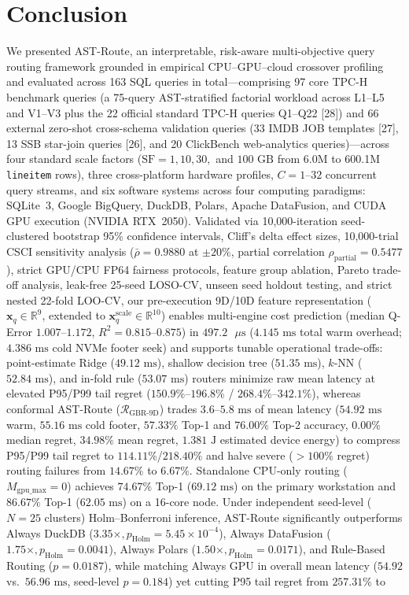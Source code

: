 \documentclass[10pt,a4paper]{article}
\begin{document}
\section{Conclusion}
We presented AST-Route, an interpretable, risk-aware multi-objective query routing framework grounded in empirical CPU--GPU--cloud crossover profiling and evaluated across 163 SQL queries in total---comprising 97 core TPC-H benchmark queries (a 75-query AST-stratified factorial workload across L1--L5 and V1--V3 plus the 22 official standard TPC-H queries Q1--Q22 [28]) and 66 external zero-shot cross-schema validation queries (33 IMDB JOB templates [27], 13 SSB star-join queries [26], and 20 ClickBench web-analytics queries)---across four standard scale factors ($\text{SF}=1, 10, 30,$ and $100\text{ GB}$ from 6.0M to 600.1M \texttt{lineitem} rows), three cross-platform hardware profiles, $C=1\text{--}32$ concurrent query streams, and six software systems across four computing paradigms: SQLite~3, Google BigQuery, DuckDB, Polars, Apache DataFusion, and CUDA GPU execution (NVIDIA RTX~2050). Validated via 10,000-iteration seed-clustered bootstrap 95\% confidence intervals, Cliff's delta effect sizes, 10,000-trial CSCI sensitivity analysis ($\bar{\rho}=0.9880$ at $\pm 20\%$, partial correlation $\rho_{\text{partial}}=0.5477$), strict GPU/CPU FP64 fairness protocols, feature group ablation, Pareto trade-off analysis, leak-free 25-seed LOSO-CV, unseen seed holdout testing, and strict nested 22-fold LOO-CV, our pre-execution 9D/10D feature representation ($\mathbf{x}_q\in\mathbb{R}^9$, extended to $\mathbf{x}_q^{\text{scale}}\in\mathbb{R}^{10}$) enables multi-engine cost prediction (median Q-Error $1.007\text{--}1.172$, $R^2=0.815\text{--}0.875$) in $497.2\text{ }\mu\text{s}$ ($4.145\text{ ms}$ total warm overhead; $4.386\text{ ms}$ cold NVMe footer seek) and supports tunable operational trade-offs: point-estimate Ridge ($49.12\text{ ms}$), shallow decision tree ($51.35\text{ ms}$), $k$-NN ($52.84\text{ ms}$), and in-fold rule ($53.07\text{ ms}$) routers minimize raw mean latency at elevated P95/P99 tail regret ($150.9\%\text{--}196.8\%$ / $268.4\%\text{--}342.1\%$), whereas conformal AST-Route ($\mathcal{R}_{\text{GBR-9D}}$) trades $3.6\text{--}5.8\text{ ms}$ of mean latency ($54.92\text{ ms}$ warm, $55.16\text{ ms}$ cold footer, $57.33\%$ Top-1 and $76.00\%$ Top-2 accuracy, $0.00\%$ median regret, $34.98\%$ mean regret, $1.381\text{ J}$ estimated device energy) to compress P95/P99 tail regret to $114.11\%$/$218.40\%$ and halve severe ($>100\%$ regret) routing failures from $14.67\%$ to $6.67\%$. Standalone CPU-only routing ($M_{\text{gpu\_max}}=0$) achieves $74.67\%$ Top-1 ($69.12\text{ ms}$) on the primary workstation and $86.67\%$ Top-1 ($62.05\text{ ms}$) on a 16-core node. Under independent seed-level ($N=25$ clusters) Holm--Bonferroni inference, AST-Route significantly outperforms Always DuckDB ($3.35\times, p_{\text{Holm}}=5.45\times 10^{-4}$), Always DataFusion ($1.75\times, p_{\text{Holm}}=0.0041$), Always Polars ($1.50\times, p_{\text{Holm}}=0.0171$), and Rule-Based Routing ($p=0.0187$), while matching Always GPU in overall mean latency ($54.92$ vs.\ $56.96\text{ ms}$, seed-level $p=0.184$) yet cutting P95 tail regret from $257.31\%$ to 
\end{document}
